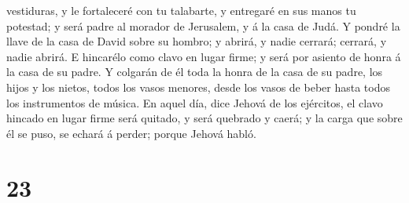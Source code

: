 vestiduras, y le fortaleceré con tu talabarte, y entregaré en sus manos
tu potestad; y será padre al morador de Jerusalem, y á la casa de Judá.
 Y pondré la llave de la casa de David sobre su hombro; y
abrirá, y nadie cerrará; cerrará, y nadie abrirá.  E
hincarélo como clavo en lugar firme; y será por asiento de honra á la
casa de su padre.  Y colgarán de él toda la honra de la
casa de su padre, los hijos y los nietos, todos los vasos menores, desde
los vasos de beber hasta todos los instrumentos de música.
 En aquel día, dice Jehová de los ejércitos, el clavo
hincado en lugar firme será quitado, y será quebrado y caerá; y la carga
que sobre él se puso, se echará á perder; porque Jehová habló.

\hypertarget{section-22}{%
\section{23}\label{section-22}}

